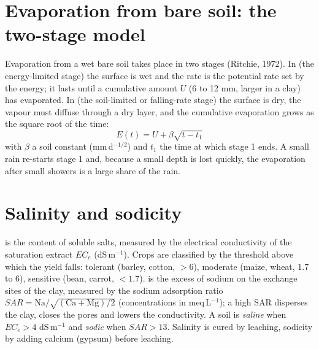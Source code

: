 \section{Evaporation from bare soil: the two-stage model}
Evaporation from a wet bare soil takes place in two stages (Ritchie, 1972). In  (the energy-limited stage) the surface is wet and the rate is the potential rate set by the energy; it lasts until a cumulative amount $U$ (6 to 12 mm, larger in a clay) has evaporated. In  (the soil-limited or falling-rate stage) the surface is dry, the vapour must diffuse through a dry layer, and the cumulative evaporation grows as the square root of the time:
\begin{equation*}\boxed{E(t)=U+\beta\sqrt{t-t_1}}\end{equation*}
with $\beta$ a soil constant (mm\,d$^{-1/2}$) and $t_1$ the time at which stage 1 ends. A small rain re-starts stage 1 and, because a small depth is lost quickly, the evaporation after small showers is a large share of the rain.

\section{Salinity and sodicity}
 is the content of soluble salts, measured by the electrical conductivity of the saturation extract $EC_e$ (dS\,m$^{-1}$). Crops are classified by the threshold above which the yield falls: tolerant (barley, cotton, $>6$), moderate (maize, wheat, 1.7 to 6), sensitive (bean, carrot, $<1.7$).  is the excess of sodium on the exchange sites of the clay, measured by the sodium adsorption ratio $SAR=\mathrm{Na}/\sqrt{(\mathrm{Ca}+\mathrm{Mg})/2}$ (concentrations in meq\,L$^{-1}$); a high SAR disperses the clay, closes the pores and lowers the conductivity. A soil is \emph{saline} when $EC_e>4$ dS\,m$^{-1}$ and \emph{sodic} when $SAR>13$. Salinity is cured by leaching, sodicity by adding calcium (gypsum) before leaching.
